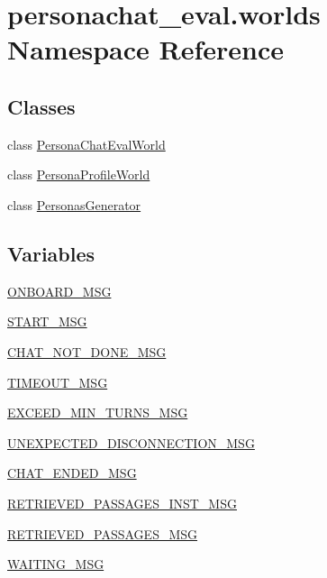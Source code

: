 \hypertarget{namespacepersonachat__eval_1_1worlds}{}\section{personachat\+\_\+eval.\+worlds Namespace Reference}
\label{namespacepersonachat__eval_1_1worlds}
\subsection*{Classes}
\begin{DoxyCompactItemize}
\item 
class \hyperlink{classpersonachat__eval_1_1worlds_1_1PersonaChatEvalWorld}{Persona\+Chat\+Eval\+World}
\item 
class \hyperlink{classpersonachat__eval_1_1worlds_1_1PersonaProfileWorld}{Persona\+Profile\+World}
\item 
class \hyperlink{classpersonachat__eval_1_1worlds_1_1PersonasGenerator}{Personas\+Generator}
\end{DoxyCompactItemize}
\subsection*{Variables}
\begin{DoxyCompactItemize}
\item 
\hyperlink{namespacepersonachat__eval_1_1worlds_a25bacdfaa3a69dff591889a95838d953}{O\+N\+B\+O\+A\+R\+D\+\_\+\+M\+SG}
\item 
\hyperlink{namespacepersonachat__eval_1_1worlds_a1936d2ddd83e5bdebdfe0f4571e6b197}{S\+T\+A\+R\+T\+\_\+\+M\+SG}
\item 
\hyperlink{namespacepersonachat__eval_1_1worlds_a8bb0f5d45fa4cc1738765aa73172129d}{C\+H\+A\+T\+\_\+\+N\+O\+T\+\_\+\+D\+O\+N\+E\+\_\+\+M\+SG}
\item 
\hyperlink{namespacepersonachat__eval_1_1worlds_a772954435907756f2e0f4c4c4cf89260}{T\+I\+M\+E\+O\+U\+T\+\_\+\+M\+SG}
\item 
\hyperlink{namespacepersonachat__eval_1_1worlds_a8c286cb94ebcd89d5c692ab0ff12f436}{E\+X\+C\+E\+E\+D\+\_\+\+M\+I\+N\+\_\+\+T\+U\+R\+N\+S\+\_\+\+M\+SG}
\item 
\hyperlink{namespacepersonachat__eval_1_1worlds_aeb63e68c156beea04cf867e53959e283}{U\+N\+E\+X\+P\+E\+C\+T\+E\+D\+\_\+\+D\+I\+S\+C\+O\+N\+N\+E\+C\+T\+I\+O\+N\+\_\+\+M\+SG}
\item 
\hyperlink{namespacepersonachat__eval_1_1worlds_af8a92bf0d017aaabd85eb352cc4b7619}{C\+H\+A\+T\+\_\+\+E\+N\+D\+E\+D\+\_\+\+M\+SG}
\item 
\hyperlink{namespacepersonachat__eval_1_1worlds_ae217103b4ea3d31a07034b8fd853a304}{R\+E\+T\+R\+I\+E\+V\+E\+D\+\_\+\+P\+A\+S\+S\+A\+G\+E\+S\+\_\+\+I\+N\+S\+T\+\_\+\+M\+SG}
\item 
\hyperlink{namespacepersonachat__eval_1_1worlds_a3c8d1d0aefa27f221dfd81c86991a760}{R\+E\+T\+R\+I\+E\+V\+E\+D\+\_\+\+P\+A\+S\+S\+A\+G\+E\+S\+\_\+\+M\+SG}
\item 
\hyperlink{namespacepersonachat__eval_1_1worlds_aed5b4151b376effe3418b8611ccaa7f5}{W\+A\+I\+T\+I\+N\+G\+\_\+\+M\+SG}
\end{DoxyCompactItemize}


